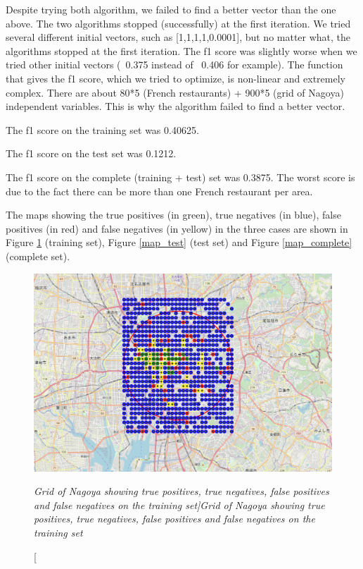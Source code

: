 \documentclass[12pt,a4paper]{article}
\begin{document}
\medskip

Despite trying both algorithm, we failed to find a better vector than the one above. The two algorithms stopped (successfully) at the first iteration. We tried several different initial vectors, such as [1,1,1,1,0.0001], but no matter what, the algorithms stopped at the first iteration. The f1 score was slightly worse when we tried other initial vectors (~0.375 instead of ~0.406 for example). The function that gives the f1 score, which we tried to optimize, is non-linear and extremely complex. There are about 80*5 (French restaurants) + 900*5 (grid of Nagoya) independent variables. This is why the algorithm failed to find a better vector.

\medskip

The f1 score on the training set was 0.40625.

\medskip

The f1 score on the test set was  0.1212.

\medskip

The f1 score on the complete (training + test) set was  0.3875. 
The worst score is due to the fact there can be more than one French restaurant per area.

\medskip

The maps showing the true positives (in green), true negatives (in blue), false positives (in red) and false negatives (in yellow) in the three cases are shown in Figure \ref{map_training} (training set), Figure \ref{map_test} (test set) and Figure \ref{map_complete} (complete set).

\begin{figure}[ht]
	\begin{center}
			  \includegraphics[width=15cm]{model_result_map_training.png}
	\end{center}
	\caption [\itshape Grid of Nagoya showing true positives, true negatives, false positives and false negatives on the training set]{\itshape Grid of Nagoya showing true positives, true negatives, false positives and false negatives on the training set}	
	\label{map_training}
\end{figure}
\end{document}
